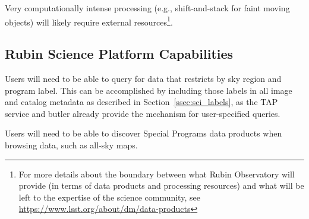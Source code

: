 Very computationally intense processing (e.g., shift-and-stack for faint moving 
objects) will likely require external resources\footnote{For more details about 
the boundary between what Rubin Observatory will provide (in terms of data products 
and processing resources) and what will be left to the expertise of the science community, 
see \url{https://www.lsst.org/about/dm/data-products}}.


\subsection{Rubin Science Platform Capabilities}\label{ssec:sci_rsp}

Users will need to be able to query for data that restricts by sky region and 
program label. 
This can be accomplished by including those labels in all image and catalog 
metadata as described in Section~\ref{ssec:sci_labels}, as the TAP service 
and butler already provide the mechanism for user-specified queries.

Users will need to be able to discover Special Programs data products when 
browsing data, such as all-sky maps. 


